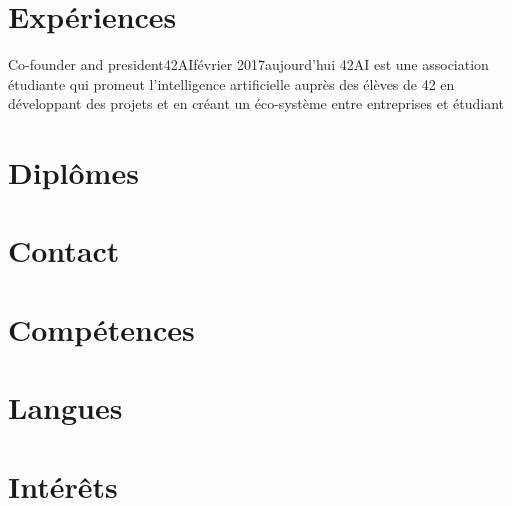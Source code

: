 \documentclass[10pt, a4paper]{resume}
\begin{document}

\address{3 rue du Landy, 92110 - Clichy}


\makecvheader

\section{Expériences}
    \resumeSubHeadingListStart
        \resumeSubheading
            {Co-founder and president}{42AI}{février 2017}{aujourd'hui}
            {42AI est une association étudiante qui promeut l’intelligence artificielle auprès des élèves de 42 en
            développant des projets et en créant un éco-système entre entreprises et étudiant}

\section{Diplômes}

\section{Contact}

\section{Compétences}

\section{Langues}

\section{Intérêts}
\end{document}
